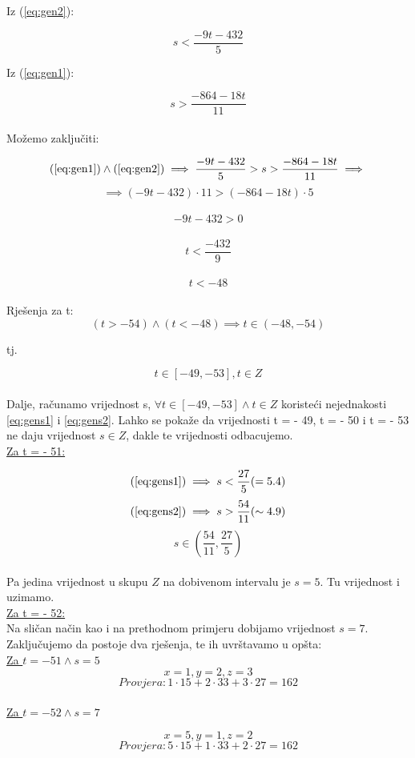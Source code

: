 \documentclass[12pt]{article}
\begin{document}
Iz (\ref{eq:gen2}):

\[
s < \frac{- 9t - 432}{5} \label{eq:gens1} \tag{A}
\]

Iz (\ref{eq:gen1}):

\[
s > \frac{- 864 - 18t}{11} \label{eq:gens2} \tag{B}
\]\\

Možemo zaključiti:

$$(\ref{eq:gen1}) \land (\ref{eq:gen2}) \implies \frac{- 9t - 432}{5} > s > \frac{- 864 - 18t}{11} \implies$$
$$\implies (- 9t - 432) \cdot 11 > (- 864 - 18t) \cdot 5$$\
$$- 9t - 432 > 0$$\
$$t < \frac{- 432}{9}$$\
$$t < -48$$\\

Rješenja za t: 
$$(t > -54) \land (t < -48) \implies t\in (-48, -54)$$

tj. 

$$t\in [-49, -53], t\in Z$$\\

Dalje, računamo vrijednost s, $\forall t\in [-49, -53] \land t\in Z$ koristeći nejednakosti \ref{eq:gens1} i \ref{eq:gens2}. Lahko se pokaže da vrijednosti t = - 49, t = - 50 i t = - 53 ne daju vrijednost $s \in Z$, dakle te vrijednosti odbacujemo.\\

\underline{Za t = - 51:}

$$(\ref{eq:gens1}) \implies s < \frac{27}{5} ( = 5.4)$$
$$(\ref{eq:gens2}) \implies s > \frac{54}{11} ( \sim 4.9)$$
$$s \in (\frac{54}{11}, \frac{27}{5})$$\\

Pa jedina vrijednost u skupu $Z$ na dobivenom intervalu je $s = 5$. Tu vrijednost i uzimamo.\\

\underline{Za t = - 52:}\\

Na sličan način kao i na prethodnom primjeru dobijamo vrijednost $s = 7$.\\

Zaključujemo da postoje dva rješenja, te ih uvrštavamo u opšta:\\

\underline{Za $t = - 51 \land s = 5$}\\

$$x = 1, y = 2, z = 3$$
$$Provjera: 1 \cdot 15 + 2 \cdot 33 + 3 \cdot 27 = 162$$\\

\underline{Za $t = - 52 \land s = 7$}

$$x = 5, y = 1, z = 2$$
$$Provjera: 5 \cdot 15 + 1 \cdot 33 + 2 \cdot 27 = 162$$\\
\end{document}
